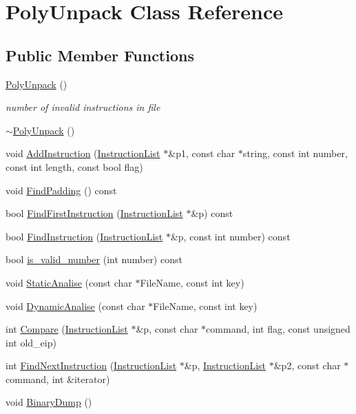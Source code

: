 \hypertarget{classPolyUnpack}{
\section{PolyUnpack Class Reference}
\label{classPolyUnpack}
}
\subsection*{Public Member Functions}
\begin{DoxyCompactItemize}
\item 
\hyperlink{classPolyUnpack_a495a7377ee57cde68b5448523ad9dbd2}{PolyUnpack} ()
\begin{DoxyCompactList}\small\item\em number of invalid instructions in file \item\end{DoxyCompactList}\item 
\hyperlink{classPolyUnpack_a37b0a31d4565390894037d2dc9b8fe08}{$\sim$PolyUnpack} ()
\item 
void \hyperlink{classPolyUnpack_a9fba41c1e0852210e7ac0eddeeba843d}{AddInstruction} (\hyperlink{structInstructionList}{InstructionList} $\ast$\&p1, const char $\ast$string, const int number, const int length, const bool flag)
\item 
void \hyperlink{classPolyUnpack_a6c4a3e26f38983c9a1134b98614f1cdb}{FindPadding} () const 
\item 
bool \hyperlink{classPolyUnpack_a49213dec58ad78d176c491f16bbc14c5}{FindFirstInstruction} (\hyperlink{structInstructionList}{InstructionList} $\ast$\&p) const 
\item 
bool \hyperlink{classPolyUnpack_ae4797cec6caf7e9927e930ef58690749}{FindInstruction} (\hyperlink{structInstructionList}{InstructionList} $\ast$\&p, const int number) const 
\item 
bool \hyperlink{classPolyUnpack_a8975a0eb244e7fdd8e7acea9555227bf}{is\_\-valid\_\-number} (int number) const 
\item 
void \hyperlink{classPolyUnpack_a3940f19400e857be686db4fe3789714b}{StaticAnalise} (const char $\ast$FileName, const int key)
\item 
void \hyperlink{classPolyUnpack_a7258cb80115be67044a9442086b19bc6}{DynamicAnalise} (const char $\ast$FileName, const int key)
\item 
int \hyperlink{classPolyUnpack_a70dca9f1f731890af945b5070d9bdb0b}{Compare} (\hyperlink{structInstructionList}{InstructionList} $\ast$\&p, const char $\ast$command, int flag, const unsigned int old\_\-eip)
\item 
int \hyperlink{classPolyUnpack_a2eaa3c2d81d64f76659dadc75c931a89}{FindNextInstruction} (\hyperlink{structInstructionList}{InstructionList} $\ast$\&p, \hyperlink{structInstructionList}{InstructionList} $\ast$\&p2, const char $\ast$command, int \&iterator)
\item 
void \hyperlink{classPolyUnpack_a1eda34787a9b8633621a6b28fd86df78}{BinaryDump} ()
\end{DoxyCompactItemize}


